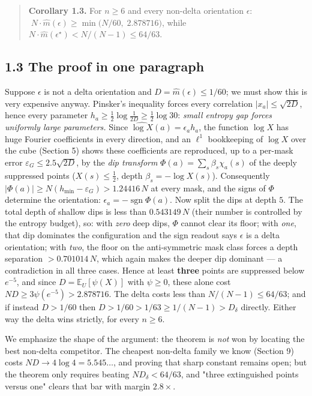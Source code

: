 \documentclass[11pt]{article}
\begin{document}
\begin{quote}
\textbf{Corollary 1.3.}  For $n \ge 6$ and every non-delta orientation $\epsilon$: $\; N \cdot \widehat m(\epsilon) \ge \min\!\big(N/60,\; 2.878716\big)$, while $N \cdot \widehat m(\epsilon^\star) < N/(N-1) \le 64/63$.
\end{quote}
\subsection*{1.3 The proof in one paragraph}
Suppose $\epsilon$ is not a delta orientation and $D = \widehat m(\epsilon) \le 1/60$; we must show this is very expensive anyway. Pinsker's inequality forces every correlation $|x_a| \le \sqrt{2D}$, hence every parameter $h_a \ge \frac12\log\frac{1}{2D} \ge \frac12\log 30$: \emph{small entropy gap forces uniformly large parameters.}  Since $\widehat{\log X}(a) = \epsilon_a h_a$, the function $\log X$ has huge Fourier coefficients in every direction, and an $\ell^1$ bookkeeping of $\log X$ over the cube (Section 5) shows these coefficients are reproduced, up to a per-mask error $\varepsilon_G \le 2.5\sqrt{2D}$, by the \emph{dip transform} $\Phi(a) = \sum_s \beta_s \chi_a(s)$ of the deeply suppressed points ($X(s) \le \frac12$, depth $\beta_s = -\log X(s)$).  Consequently $|\Phi(a)| \ge N(h_{\min} - \varepsilon_G) > 1.24416\,N$ at every mask, and the signs of $\Phi$ determine the orientation: $\epsilon_a = -\operatorname{sgn} \Phi(a)$.  Now split the dips at depth $5$.  The total depth of shallow dips is less than $0.543149\,N$ (their number is controlled by the entropy budget), so: with \emph{zero} deep dips, $\Phi$ cannot clear its floor; with \emph{one}, that dip dominates the configuration and the sign readout says $\epsilon$ is a delta orientation; with \emph{two}, the floor on the anti-symmetric mask class forces a depth separation $>0.701014\,N$, which again makes the deeper dip dominant — a contradiction in all three cases.  Hence at least \textbf{three} points are suppressed below $e^{-5}$, and since $D = \mathbb{E}_U[\psi(X)]$ with $\psi \ge 0$, these alone cost $N D \ge 3\psi(e^{-5}) > 2.878716$. The delta costs less than $N/(N-1) \le 64/63$; and if instead $D > 1/60$ then $D > 1/60 > 1/63 \ge 1/(N-1) > D_\delta$ directly. Either way the delta wins strictly, for every $n \ge 6$.

We emphasize the shape of the argument: the theorem is \emph{not} won by locating the best non-delta competitor.  The cheapest non-delta family we know (Section 9) costs $N D \to 4\log4 = 5.545\ldots$, and proving that sharp constant remains open; but the theorem only requires beating $N D_\delta < 64/63$, and "three extinguished points versus one" clears that bar with margin $2.8\times$.
\end{document}
